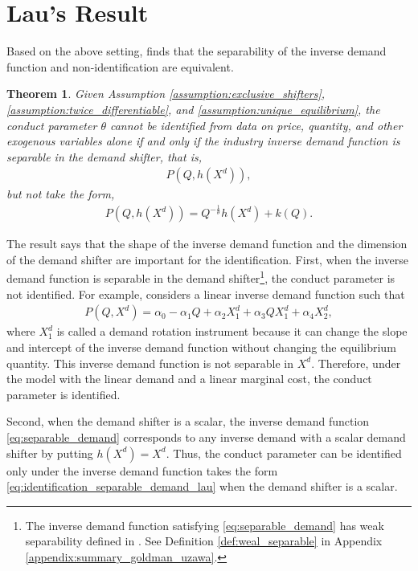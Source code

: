 \documentclass[11pt, a4paper]{article}
\newtheorem{theorem}{Theorem}
\theoremstyle{remark}
\begin{document}
\section{Lau's Result}\label{sec:lau_result} \label{sec:lau_result}
Based on the above setting, \citet{lau1982identifying} finds that the separability of the inverse demand function and non-identification are equivalent.
\begin{theorem}\label{theorem_lau}
    Given Assumption \ref{assumption:exclusive_shifters}, \ref{assumption:twice_differentiable}, and \ref{assumption:unique_equilibrium},
    the conduct parameter $\theta$ cannot be identified from data on price, quantity, and other exogenous variables alone if and only if the industry inverse demand function is separable in the demand shifter, that is,
    \begin{align}
        P(Q, h(X^{d})), \label{eq:separable_demand}
    \end{align}
    but not take the form, 
    \begin{align}
        P(Q, h(X^{d})) = Q^{-\frac{1}{\theta}}h(X^{d}) + k(Q). \label{eq:identification_separable_demand_lau}
    \end{align}
\end{theorem}
The result says that the shape of the inverse demand function and the dimension of the demand shifter are important for the identification.
First, when the inverse demand function is separable in the demand shifter\footnote{The inverse demand function satisfying \eqref{eq:separable_demand} has weak separability defined in \citet{goldmanNote1964}. See Definition \ref{def:weal_separable} in Appendix \ref{appendix:summary_goldman_uzawa}.}, the conduct parameter is not identified.
For example, \citet{bresnahan1982oligopoly} considers a linear inverse demand function such that
\begin{align}
    P(Q, X^{d}) = \alpha_0 - \alpha_1Q + \alpha_2X^{d}_1 + \alpha_3QX^{d}_1 + \alpha_4X^{d}_2, \label{eq:demand_bresnahan}
\end{align}
where $X^{d}_1$ is called a demand rotation instrument because it can change the slope and intercept of the inverse demand function without changing the equilibrium quantity.
This inverse demand function is not separable in $X^{d}$.
Therefore, under the model with the linear demand and a linear marginal cost, the conduct parameter is identified.

Second, when the demand shifter is a scalar, the inverse demand function \eqref{eq:separable_demand} corresponds to any inverse demand with a scalar demand shifter by putting $h(X^{d})= X^{d}$.
Thus, the conduct parameter can be identified only under the inverse demand function takes the form \eqref{eq:identification_separable_demand_lau} when the demand shifter is a scalar.
\end{document}
